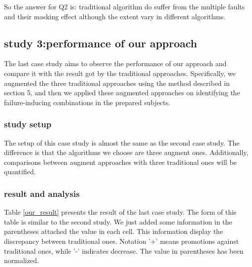 \documentclass{sig-alternate}
\begin{document}
So the answer for Q2 is: traditional algorithm do suffer from the multiple faults and their masking effect although the extent vary in different algorithms.

\subsection{study 3:performance of our approach}
The last case study aims to observe the performance of our approach and compare it with the result got by the traditional approaches. Specifically, we augmented the three traditional approaches using the method described in section 5, and then we applied these augmented approaches on identifying the failure-inducing combinations in the prepared subjects.

\subsubsection{study setup}
The setup of this case study is almost the same as the second case study. The difference is that the algorithms we choose are three augment ones. Additionally, comparisons between augment approaches with three traditional ones will be quantified.

\subsubsection{result and analysis}
Table \ref{our_result} presents the result of the last case study. The form of this table is similar to the second study. We just added some information in the parentheses attached the value in each cell. This information display the  discrepancy between traditional ones. Notation '+' means promotions against traditional ones, while '-' indicates decrease. The value in parentheses has been normalized.
\end{document}
